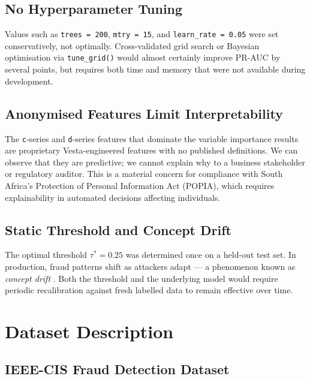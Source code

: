 \documentclass[12pt, a4paper]{article}
\begin{document}
\subsection{No Hyperparameter Tuning}

Values such as \texttt{trees = 200}, \texttt{mtry = 15}, and
\texttt{learn\_rate = 0.05} were set conservatively, not optimally.
Cross-validated grid search or Bayesian optimisation via \texttt{tune\_grid()}
would almost certainly improve PR-AUC by several points, but requires both time
and memory that were not available during development.

\subsection{Anonymised Features Limit Interpretability}

The \texttt{c}-series and \texttt{d}-series features that dominate the variable
importance results are proprietary Vesta-engineered features with no published
definitions. We can observe that they are predictive; we cannot explain why to a
business stakeholder or regulatory auditor. This is a material concern for
compliance with South Africa's Protection of Personal Information Act (POPIA),
which requires explainability in automated decisions affecting individuals.

\subsection{Static Threshold and Concept Drift}

The optimal threshold $\tau^* = 0.25$ was determined once on a held-out test set.
In production, fraud patterns shift as attackers adapt --- a phenomenon known as
\textit{concept drift} \cite{gama2014}. Both the threshold and the underlying
model would require periodic recalibration against fresh labelled data to remain
effective over time.

\section{Dataset Description}

\subsection{IEEE-CIS Fraud Detection Dataset}
\end{document}
